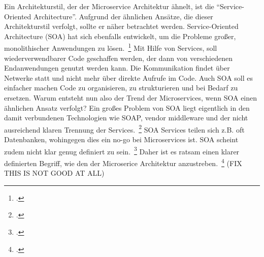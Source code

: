 Ein Architekturstil, der der Microservice Architektur ähnelt, ist die ``Service-Oriented Architecture''. Aufgrund der ähnlichen Ansätze, die dieser Architekturstil verfolgt, sollte er näher betrachtet werden.
Service-Oriented Architecture (SOA) hat sich ebenfalls entwickelt, um die Probleme großer, monolithischer Anwendungen zu lösen.~\footcite[][Seite 8]{newman2015building} Mit Hilfe von Services, soll wiederverwendbarer Code geschaffen werden, der dann von verschiedenen Endanwendungen genutzt werden kann. Die Kommunikation findet über Netwerke statt und nicht mehr über direkte Aufrufe im Code. Auch SOA soll es einfacher machen Code zu organisieren, zu strukturieren und bei Bedarf zu ersetzen. Warum entsteht nun also der Trend der Microservices, wenn SOA einen ähnlichen Ansatz verfolgt? Ein großes Problem von SOA liegt eigentlich in den damit verbundenen Technologien wie SOAP, vendor middleware und der nicht ausreichend klaren Trennung der Services.~\footcite[][Seite 8]{newman2015building} SOA Services teilen sich z.B. oft Datenbanken, wohingegen dies ein no-go bei Microservices ist. SOA scheint zudem nicht klar genug definiert zu sein.~\footcite[vgl.][]{Fowler:Intro} Daher ist es ratsam einen klarer definierten Begriff, wie den der Microserice Architektur anzustreben.~\footcite[][]{Fowler:Intro}
(FIX THIS IS NOT GOOD AT ALL)

